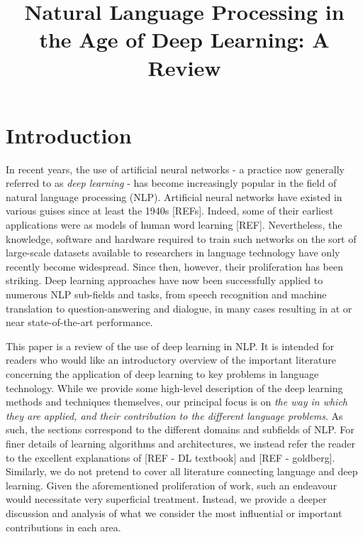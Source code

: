 \documentclass[11pt,letterpaper]{article}
\title{Natural Language Processing in the Age of Deep Learning: A Review}
\date{}
\begin{document}
\maketitle

\begin{abstract}

\end{abstract}


\section{Introduction}

In recent years, the use of artificial neural networks - a practice now generally referred to as \emph{deep learning} - has become increasingly popular in the field of natural language processing (NLP). Artificial neural networks have existed in various guises since at least the 1940s [REFs]. Indeed, some of their earliest applications were as models of human word learning [REF]. Nevertheless, the knowledge, software and hardware required to train such networks on the sort of large-scale datasets available to researchers in language technology have only recently become widespread. Since then, however, their proliferation has been striking. Deep learning approaches have now been successfully applied to numerous NLP sub-fields and tasks, from speech recognition and machine translation to question-answering and dialogue, in many cases resulting in at or near state-of-the-art performance.  

This paper is a review of the use of deep learning in NLP. It is intended for readers who would like an introductory overview of the important literature concerning the application of deep learning to key problems in language technology. While we provide some high-level description of the deep learning methods and techniques themselves, our principal focus is on \emph{the way in which they are applied, and their contribution to the different language problems}. As such, the sections correspond to the different domains and subfields of NLP. For finer details of learning algorithms and architectures, we instead refer the reader to the excellent explanations of [REF - DL textbook] and [REF - goldberg]. Similarly, we do not pretend to cover all literature connecting language and deep learning. Given the aforementioned proliferation of work, such an endeavour would necessitate very superficial treatment. Instead, we provide a deeper discussion and analysis of what we consider the most influential or important contributions in each area. 
\end{document}
